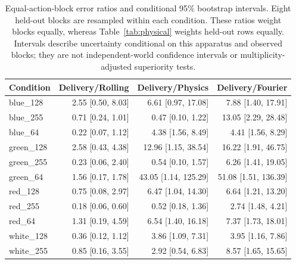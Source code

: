 \begin{table}[ht]
\centering\small
\begin{tabular}{lrrr}
\toprule
Condition & Delivery/Rolling & Delivery/Physics & Delivery/Fourier\\
\midrule
blue\_128 & 2.55 [0.50, 8.03] & 6.61 [0.97, 17.08] & 7.88 [1.40, 17.91]\\
blue\_255 & 0.71 [0.24, 1.01] & 0.47 [0.10, 1.22] & 13.05 [2.29, 28.48]\\
blue\_64 & 0.22 [0.07, 1.12] & 4.38 [1.56, 8.49] & 4.41 [1.56, 8.29]\\
green\_128 & 2.58 [0.43, 4.38] & 12.96 [1.15, 38.54] & 16.22 [1.91, 46.75]\\
green\_255 & 0.23 [0.06, 2.40] & 0.54 [0.10, 1.57] & 6.26 [1.41, 19.05]\\
green\_64 & 1.56 [0.17, 1.78] & 43.05 [1.14, 125.29] & 51.08 [1.51, 136.39]\\
red\_128 & 0.75 [0.08, 2.97] & 6.47 [1.04, 14.30] & 6.64 [1.21, 13.20]\\
red\_255 & 0.18 [0.06, 0.60] & 0.52 [0.18, 1.36] & 2.74 [1.48, 4.21]\\
red\_64 & 1.31 [0.19, 4.59] & 6.54 [1.40, 16.18] & 7.37 [1.73, 18.01]\\
white\_128 & 0.36 [0.12, 1.12] & 3.86 [1.09, 7.31] & 3.95 [1.16, 7.86]\\
white\_255 & 0.85 [0.16, 3.55] & 2.92 [0.54, 6.83] & 8.57 [1.65, 15.65]\\
\bottomrule
\end{tabular}
\caption{Equal-action-block error ratios and conditional 95\% bootstrap intervals. Eight held-out blocks are resampled within each condition. These ratios weight blocks equally, whereas Table~\ref{tab:physical} weights held-out rows equally. Intervals describe uncertainty conditional on this apparatus and observed blocks; they are not independent-world confidence intervals or multiplicity-adjusted superiority tests.}
\label{tab:physical-ci}
\end{table}
